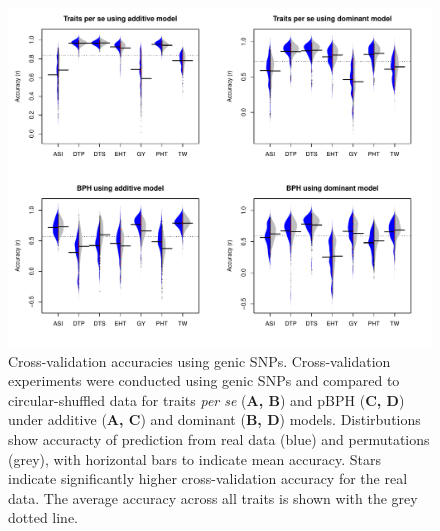 \documentclass[9pt,twocolumn,twoside]{gsajnl}
\begin{document}
\begin{figure}[htbp]
\centering
\includegraphics[width=\linewidth]{SFig_genicsnp.pdf}
\caption{Cross-validation accuracies using genic SNPs. Cross-validation experiments were conducted using genic SNPs and compared to circular-shuffled data for traits \emph{per se} (\textbf{A, B}) and pBPH (\textbf{C, D}) under additive (\textbf{A, C}) and dominant (\textbf{B, D}) models. Distirbutions show accuracty of prediction from real data (blue) and permutations (grey), with horizontal bars to indicate mean accuracy.  Stars indicate significantly higher cross-validation accuracy for the real data.  The average accuracy across all traits is shown with the grey dotted line. }
\label{fig:genicsnp}
\end{figure}
\end{document}
